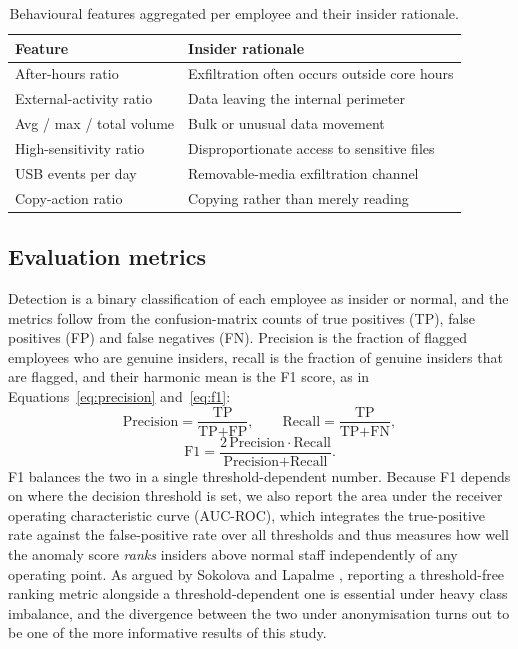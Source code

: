 \documentclass[10pt,a4paper]{article}
\begin{document}
\begin{table}[tb]
\centering
\caption{Behavioural features aggregated per employee and their insider rationale.}
\label{tab:features}
\small
\begin{tabularx}{\linewidth}{@{}p{3.4cm} L@{}}
\toprule
\textbf{Feature} & \textbf{Insider rationale}\\
\midrule
After-hours ratio & Exfiltration often occurs outside core hours \\
External-activity ratio & Data leaving the internal perimeter \\
Avg / max / total volume & Bulk or unusual data movement \\
High-sensitivity ratio & Disproportionate access to sensitive files \\
USB events per day & Removable-media exfiltration channel \\
Copy-action ratio & Copying rather than merely reading \\
\bottomrule
\end{tabularx}
\end{table}

\subsection{Evaluation metrics}
Detection is a binary classification of each employee as insider or normal, and the metrics follow from the confusion-matrix counts of true positives (TP), false positives (FP) and false negatives (FN). Precision is the fraction of flagged employees who are genuine insiders, recall is the fraction of genuine insiders that are flagged, and their harmonic mean is the F1 score, as in Equations~\eqref{eq:precision} and~\eqref{eq:f1}:
\begin{equation}
\label{eq:precision}
\text{Precision}=\frac{\text{TP}}{\text{TP}+\text{FP}},
\qquad
\text{Recall}=\frac{\text{TP}}{\text{TP}+\text{FN}},
\end{equation}
\vspace{-1.1em}
\begin{equation}
\label{eq:f1}
\text{F1}=\frac{2\,\text{Precision}\cdot\text{Recall}}{\text{Precision}+\text{Recall}}.
\end{equation}
F1 balances the two in a single threshold-dependent number. Because F1 depends on where the decision threshold is set, we also report the area under the receiver operating characteristic curve (AUC-ROC), which integrates the true-positive rate against the false-positive rate over all thresholds and thus measures how well the anomaly score \emph{ranks} insiders above normal staff independently of any operating point. As argued by Sokolova and Lapalme \cite{sokolova2009}, reporting a threshold-free ranking metric alongside a threshold-dependent one is essential under heavy class imbalance, and the divergence between the two under anonymisation turns out to be one of the more informative results of this study.
\end{document}

